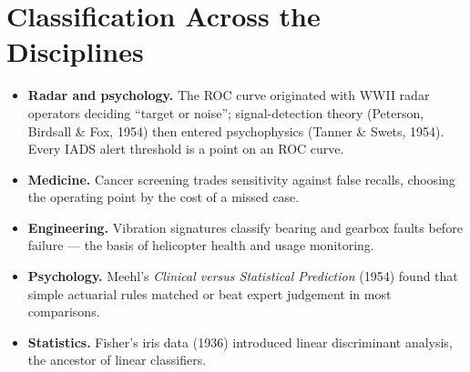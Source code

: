 \documentclass[11pt]{article}
\begin{document}
\section{Classification Across the Disciplines}
\begin{itemize}
\item \textbf{Radar and psychology.} The ROC curve originated with WWII radar operators deciding ``target or noise''; signal-detection theory (Peterson, Birdsall \& Fox, 1954) then entered psychophysics (Tanner \& Swets, 1954). Every IADS alert threshold is a point on an ROC curve.
\item \textbf{Medicine.} Cancer screening trades sensitivity against false recalls, choosing the operating point by the cost of a missed case.
\item \textbf{Engineering.} Vibration signatures classify bearing and gearbox faults before failure --- the basis of helicopter health and usage monitoring.
\item \textbf{Psychology.} Meehl's \textit{Clinical versus Statistical Prediction} (1954) found that simple actuarial rules matched or beat expert judgement in most comparisons.
\item \textbf{Statistics.} Fisher's iris data (1936) introduced linear discriminant analysis, the ancestor of linear classifiers.
\end{itemize}
\end{document}
